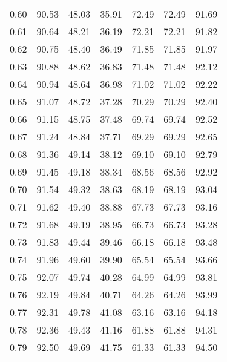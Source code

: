 \begin{tabular}{|c|c|c|c|c|c|c|}
      0.60 &     90.53 &     48.03 &      35.91 &   72.49 &      72.49 &         91.69 \\
      0.61 &     90.64 &     48.21 &      36.19 &   72.21 &      72.21 &         91.82 \\
      0.62 &     90.75 &     48.40 &      36.49 &   71.85 &      71.85 &         91.97 \\
      0.63 &     90.88 &     48.62 &      36.83 &   71.48 &      71.48 &         92.12 \\
      0.64 &     90.94 &     48.64 &      36.98 &   71.02 &      71.02 &         92.22 \\
      0.65 &     91.07 &     48.72 &      37.28 &   70.29 &      70.29 &         92.40 \\
      0.66 &     91.15 &     48.75 &      37.48 &   69.74 &      69.74 &         92.52 \\
      0.67 &     91.24 &     48.84 &      37.71 &   69.29 &      69.29 &         92.65 \\
      0.68 &     91.36 &     49.14 &      38.12 &   69.10 &      69.10 &         92.79 \\
      0.69 &     91.45 &     49.18 &      38.34 &   68.56 &      68.56 &         92.92 \\
      0.70 &     91.54 &     49.32 &      38.63 &   68.19 &      68.19 &         93.04 \\
      0.71 &     91.62 &     49.40 &      38.88 &   67.73 &      67.73 &         93.16 \\
      0.72 &     91.68 &     49.19 &      38.95 &   66.73 &      66.73 &         93.28 \\
      0.73 &     91.83 &     49.44 &      39.46 &   66.18 &      66.18 &         93.48 \\
      0.74 &     91.96 &     49.60 &      39.90 &   65.54 &      65.54 &         93.66 \\
      0.75 &     92.07 &     49.74 &      40.28 &   64.99 &      64.99 &         93.81 \\
      0.76 &     92.19 &     49.84 &      40.71 &   64.26 &      64.26 &         93.99 \\
      0.77 &     92.31 &     49.78 &      41.08 &   63.16 &      63.16 &         94.18 \\
      0.78 &     92.36 &     49.43 &      41.16 &   61.88 &      61.88 &         94.31 \\
      0.79 &     92.50 &     49.69 &      41.75 &   61.33 &      61.33 &         94.50 \\

\end{tabular}

